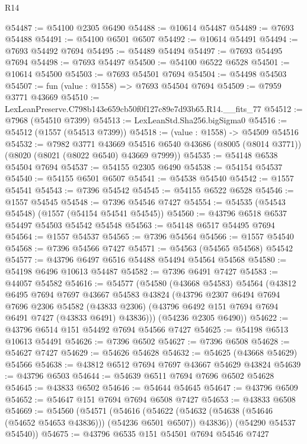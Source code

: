\begin{lexlean}{R14}
\begin{coremodule}
@54487 := @54100 @2305 @6490
@54488 := @10614 @54487
@54489 := @7693 @54488
@54491 := @54100 @6501 @6507
@54492 := @10614 @54491
@54494 := @7693 @54492 @7694
@54495 := @54489 @54494
@54497 := @7693 @54495 @7694
@54498 := @7693 @54497
@54500 := @54100 @6522 @6528
@54501 := @10614 @54500
@54503 := @7693 @54501 @7694
@54504 := @54498 @54503
@54507 := fun (value : @1558) => @7693 @54504 @7694
@54509 := @7959 @3771 @43669
@54510 := LexLeanPreserve.C798b143e659cb50f0f127c89e7d93b65.R14.__fits_77
@54512 := @7968 (@54510 @7399)
@54513 := LexLeanStd.Sha256.bigSigma0
@54516 := @54512 (@1557 (@54513 @7399))
@54518 := (value : @1558) -> @54509 @54516
@54532 := @7982
    @3771
    @43669
    @54516
    @6540
    @43686
    (@8005 (@8014 @3771))
    (@8020 (@8021 (@8022 @6540) @43669 @7999))
@54535 := @54148 @6538 @54504 @7694
@54537 := @54155 @2305 @6490
@54538 := @54154 @54537
@54540 := @54155 @6501 @6507
@54541 := @54538 @54540
@54542 := @1557 @54541
@54543 := @7396 @54542
@54545 := @54155 @6522 @6528
@54546 := @1557 @54545
@54548 := @7396 @54546 @7427
@54554 := @54535 (@54543 @54548) (@1557 (@54154 @54541 @54545))
@54560 := @43796 @6518 @6537 @54497 @54503 @54542 @54548
@54563 := @54148 @6517 @54495 @7694
@54564 := @1557 @54537
@54565 := @7396 @54564
@54566 := @1557 @54540
@54568 := @7396 @54566 @7427
@54571 := @54563 (@54565 @54568) @54542
@54577 := @43796 @6497 @6516 @54488 @54494 @54564 @54568
@54580 := @54198 @6496 @10613 @54487
@54582 := @7396 @6491 @7427
@54583 := @44057 @54582
@54616 := @54577
    (@54580
      (@43668 @54583)
      @54564
      (@43812
        @6495
        @7694
        @7697
        @43667
        @54583
        @43824
        (@43796
          @2307
          @6494
          @7694
          @7696
          @2306
          @54582
          (@43833 @2306)
          (@43796 @6492 @151 @7694 @7694 @6491 @7427 (@43833 @6491) @43836)))
      (@54236 @2305 @6490))
@54622 := @43796 @6514 @151 @54492 @7694 @54566 @7427
@54625 := @54198 @6513 @10613 @54491
@54626 := @7396 @6502
@54627 := @7396 @6508
@54628 := @54627 @7427
@54629 := @54626 @54628
@54632 := @54625 (@43668 @54629) @54566
@54638 := @43812 @6512 @7694 @7697 @43667 @54629 @43824
@54639 := @43796 @6503
@54644 := @54639 @6511 @7694 @7696 @6502 @54628
@54645 := @43833 @6502
@54646 := @54644 @54645
@54647 := @43796 @6509
@54652 := @54647 @151 @7694 @7694 @6508 @7427
@54653 := @43833 @6508
@54669 := @54560
    (@54571
      (@54616
        (@54622 (@54632 (@54638 (@54646 (@54652 @54653 @43836))) (@54236 @6501 @6507)) @43836))
      (@54290 @54537 @54540))
@54675 := @43796 @6535 @151 @54501 @7694 @54546 @7427

\end{coremodule}
\end{lexlean}

